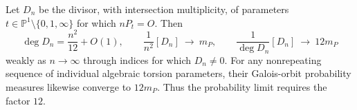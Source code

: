 \begin{proposition}\label{ari:C.8.10}
Let $D_n$ be the divisor, with intersection multiplicity, of
parameters $t\in\mathbb P^1\setminus\{0,1,\infty\}$ for which
$nP_t=O$. Then
\[
 \deg D_n=\frac{n^2}{12}+O(1),\qquad
 \frac1{n^2}[D_n]\ \longrightarrow\ m_P,\qquad
 \frac1{\deg D_n}[D_n]\ \longrightarrow\ 12m_P
\]
weakly as $n\to\infty$ through indices for which $D_n\ne0$.
For any nonrepeating sequence of individual algebraic torsion
parameters, their Galois-orbit probability measures likewise
converge to $12m_P$. Thus the probability limit requires the factor $12$.
\end{proposition}


